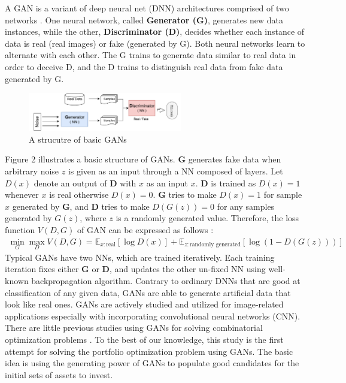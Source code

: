 \documentclass[11pt]{article}
\begin{document}
	A GAN is a variant of deep neural net (DNN) architectures comprised of two networks \citep{goodfellow2014generative}. One neural network, called \textbf{Generator (G)}, generates new data instances, while the other, \textbf{Discriminator (D)}, decides whether each instance of data is real (real images) or fake (generated by G). Both neural networks learn to alternate with each other. The G trains to generate data similar to real data in order to deceive D, and the D trains to distinguish real data from fake data generated by G. 
	\begin{figure}[h] 
		\begin{center}
			\includegraphics[width=0.6\textwidth]{GAN_basic}
			\caption{A strucutre of basic GANs} \label{fig:GAN-basic}
		\end{center}
	\end{figure}
	Figure 2 illustrates a basic structure of GANs. \textbf{G} generates fake data when arbitrary noise $z$ is given as an input through a NN composed of layers. Let $D(x)$ denote an output of \textbf{D} with $x$ as an input $x$. \textbf{D} is trained as $D(x)=1$ whenever $x$ is real otherwise $D(x)=0$. \textbf{G} tries to make $D(x) = 1$ for sample $x$ generated by \textbf{G}, and \textbf{D} tries to make $D(G(z)) = 0$ for any samples generated by $G(z)$, where $z$ is a randomly generated value. Therefore, the loss function $V(D,G)$ of GAN can be expressed as follows \citep{goodfellow2014generative}:
	\begin{align*}
	\min_G \max_D V(D,G)  = \mathbb{E}_{x:\text{real}}\left[\log D(x) \right]  + \mathbb{E}_{z:\text{randomly generated}} \left[\log(1-D(G(z))) \right] 
	\end{align*}
	Typical GANs have two NNs, which are trained iteratively. Each training iteration fixes either \textbf{G} or \textbf{D}, and updates the other un-fixed NN using well-known backpropagation algorithm. Contrary to ordinary DNNs that are good at classification of any given data, GANs are able to generate artificial data that look like real ones. GANs are actively studied and utilized for image-related applications especially with incorporating convolutional neural networks (CNN). There are little previous studies using GANs for solving combinatorial optimization problems \citep{Anonymous:F_g9Hkad}. To the best of our knowledge, this study is the first attempt for solving the portfolio optimization problem using GANs. The basic idea is using the generating power of GANs to populate good candidates for the initial sets of assets to invest.
	
\end{document}

